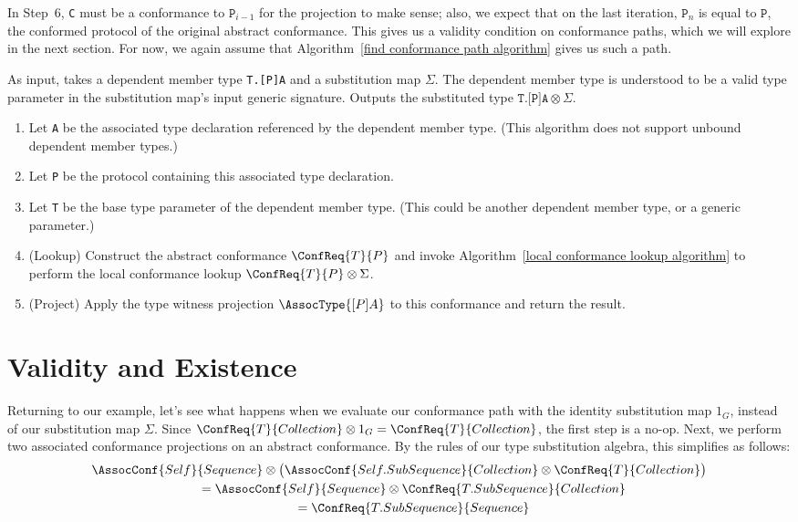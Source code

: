 \documentclass[../generics]{subfiles}
\begin{document}
In Step~6, \texttt{C} must be a conformance to $\texttt{P}_{i-1}$ for the projection to make sense; also, we expect that on the last iteration, $\texttt{P}_n$ is equal to $\texttt{P}$, the conformed protocol of the original abstract conformance. This gives us a validity condition on conformance paths, which we will explore in the next section. For now, we again assume that Algorithm~\ref{find conformance path algorithm} gives us such a path.
\begin{algorithm}\label{dependent member type substitution}
As input, takes a dependent member type \texttt{T.[P]A} and a substitution map $\Sigma$. The dependent member type is understood to be a valid type parameter in the substitution map's input generic signature. Outputs the substituted type $\texttt{T.[P]A}\otimes\Sigma$.
\begin{enumerate}
\item Let \texttt{A} be the associated type declaration referenced by the dependent member type. (This algorithm does not support unbound dependent member types.)
\item Let \texttt{P} be the protocol containing this associated type declaration.
\item Let \texttt{T} be the base type parameter of the dependent member type. (This could be another dependent member type, or a generic parameter.)
\item (Lookup) Construct the abstract conformance $\ConfReq{T}{P}$ and invoke Algorithm~\ref{local conformance lookup algorithm} to perform the local conformance lookup $\ConfReq{T}{P}\otimes\Sigma$.
\item (Project) Apply the type witness projection $\AssocType{[P]A}$ to this conformance and return the result.
\end{enumerate}
\end{algorithm}

\section{Validity and Existence}\label{conformance paths exist}

Returning to our example, let's see what happens when we evaluate our conformance path with the identity substitution map $1_G$, instead of our substitution map $\Sigma$. Since $\ConfReq{T}{Collection}\otimes 1_G=\ConfReq{T}{Collection}$, the first step is a no-op. Next, we perform two associated conformance projections on an abstract conformance. By the rules of our type substitution algebra, this simplifies as follows:
\begin{gather*}
\AssocConf{Self}{Sequence} \otimes \bigl(\AssocConf{Self.SubSequence}{Collection} \otimes \ConfReq{T}{Collection}\bigr)\\
\qquad {} = \AssocConf{Self}{Sequence} \otimes \ConfReq{T.SubSequence}{Collection}\\
\qquad {} = \ConfReq{T.SubSequence}{Sequence}
\end{gather*}
\end{document}
